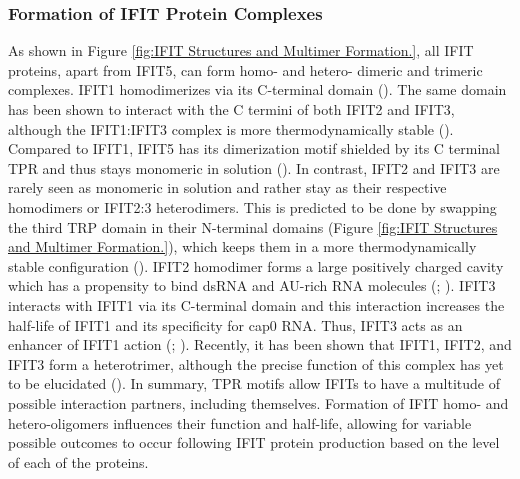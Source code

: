 \subsubsection{Formation of IFIT Protein Complexes} \label{Formation of IFIT Protein Complexes}
As shown in Figure \ref{fig:IFIT Structures and Multimer Formation.}, all IFIT proteins, apart from IFIT5, can form homo- and hetero- dimeric and trimeric complexes. IFIT1 homodimerizes via its C-terminal domain (\cite{Abbas2013StructuralProteins}). The same domain has been shown to interact with the C termini of both IFIT2 and IFIT3, although the IFIT1:IFIT3 complex is more thermodynamically stable (\cite{Fleith2018IFIT3RNA}). Compared to IFIT1, IFIT5 has its dimerization motif shielded by its C terminal TPR and thus stays monomeric in solution (\cite{Kumar2014InhibitionMRNAs}). In contrast, IFIT2 and IFIT3 are rarely seen as monomeric in solution and rather stay as their respective homodimers or IFIT2:3 heterodimers. This is predicted to be done by swapping the third TRP domain in their N-terminal domains (Figure \ref{fig:IFIT Structures and Multimer Formation.}), which keeps them in a more thermodynamically stable configuration (\cite{Yang2012CrystalMechanisms}). IFIT2 homodimer forms a large positively charged cavity which has a propensity to bind dsRNA and AU-rich RNA molecules (\cite{Vladimer2014IFITs:Proteins}; \cite{Yang2012CrystalMechanisms}). IFIT3 interacts with IFIT1 via its C-terminal domain and this interaction increases the half-life of IFIT1 and its specificity for cap0 RNA. Thus, IFIT3 acts as an enhancer of IFIT1 action (\cite{Fleith2018IFIT3RNA}; \cite{Johnson2018HumanStability}). Recently, it has been shown that IFIT1, IFIT2, and IFIT3 form a heterotrimer, although the precise function of this complex has yet to be elucidated (\cite{Fleith2018IFIT3RNA}). In summary, TPR motifs allow IFITs to have a multitude of possible interaction partners, including themselves. Formation of IFIT homo- and hetero-oligomers influences their function and half-life, allowing for variable possible outcomes to occur following IFIT protein production based on the level of each of the proteins. 

